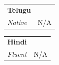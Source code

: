 \documentclass[a4paper,11pt]{article}
\begin{document}
\begin{tabularx}{\linewidth}{@{}X r@{}}
  \textbf{Telugu} & \textbf{ } \\
  \textit{\color{lightgray}Native} & \small\color{lightgray}N/A \\
\end{tabularx}

\begin{tabularx}{\linewidth}{@{}X r@{}}
  \textbf{Hindi} & \textbf{} \\
  \textit{\color{lightgray}Fluent} & \small\color{lightgray}N/A \\
\end{tabularx}
\end{document}
